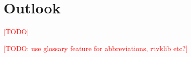 
\chapter{Outlook}
\textcolor{red}{[TODO]}

\textcolor{red}{[TODO: use glossary feature for abbreviations, rtvklib etc?]}